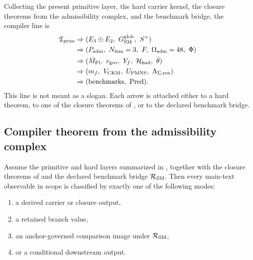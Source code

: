 Collecting the present primitive layer, the hard carrier kernel, the closure theorems from the admissibility complex, and the benchmark bridge, the compiler line is
\begin{equation}
\label{eq:conditional-compiler-chain}
\begin{aligned}
\Tprim
&\Rightarrow
(E_3\oplus E_2,\ G_{\SM}^{\mathrm{glob}},\ S^+)\\
&\Rightarrow
( \Padm,\ N_{\mathrm{fam}}=3,\ F,\ \Oadm=48,\ \Phi)\\
&\Rightarrow
( \Mpl,\ \vgeo,\ Y_f,\ \Hhad,\ \bar\theta )\\
&\Rightarrow
(m_f,\ V_{\mathrm{CKM}},\ U_{\mathrm{PMNS}},\ \Lambda_{\Seam,\mathrm{ren}})\\
&\Rightarrow
(\text{benchmarks},\ \Pred).
\end{aligned}
\end{equation}
This line is not meant as a slogan. Each arrow is attached either to a hard theorem, to one of the closure theorems of , or to the declared benchmark bridge.

\subsection{Compiler theorem from the admissibility complex}

\begin{theorem}
Assume the primitive and hard layers summarized in , together with the closure theorems of  and the declared benchmark bridge $\mathcal R_{\mathrm{SM}}$. Then every main-text observable in scope is classified by exactly one of the following modes:
\begin{enumerate}[label=(\roman*), leftmargin=1.5em, topsep=3pt, itemsep=2pt]
    \item a derived carrier or closure output,
    \item a retained branch value,
    \item an anchor-governed comparison image under $\mathcal R_{\mathrm{SM}}$,
    \item or a conditional downstream output.
\end{enumerate}
\end{theorem}

